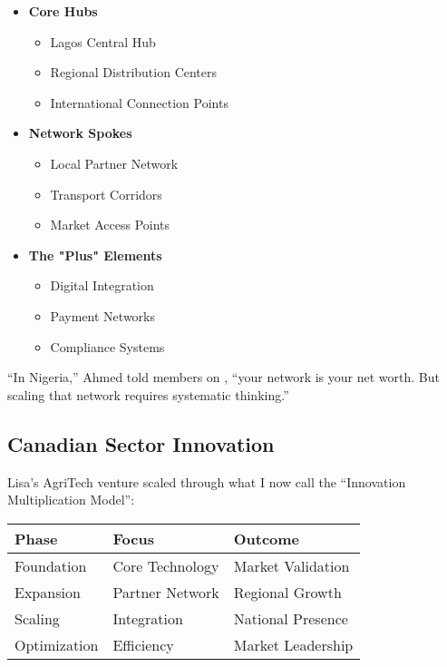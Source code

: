 \begin{tcolorbox}[colback=white,colframe=primarydark,title=\textbf{Trade Network Scaling}]
\begin{itemize}
    \item \textbf{Core Hubs}
    \begin{itemize}
        \item Lagos Central Hub
        \item Regional Distribution Centers
        \item International Connection Points
    \end{itemize}

    \item \textbf{Network Spokes}
    \begin{itemize}
        \item Local Partner Network
        \item Transport Corridors
        \item Market Access Points
    \end{itemize}

    \item \textbf{The "Plus" Elements}
    \begin{itemize}
        \item Digital Integration
        \item Payment Networks
        \item Compliance Systems
    \end{itemize}
\end{itemize}
\end{tcolorbox}

``In Nigeria,'' Ahmed told members on , ``your network is your net worth. But scaling that network requires systematic thinking.''

\subsection{Canadian Sector Innovation}\label{subsec:canadian-sector-innovation}

Lisa's AgriTech venture scaled through what I now call the ``Innovation Multiplication Model'':

\begin{center}
\begin{tabularx}{\textwidth}{>{\raggedright\arraybackslash}X >{\centering\arraybackslash}X >{\raggedright\arraybackslash}X}
    \toprule
    \textbf{Phase} & \textbf{Focus} & \textbf{Outcome} \\
    \midrule
    Foundation & Core Technology & Market Validation \\
    Expansion & Partner Network & Regional Growth \\
    Scaling & Integration & National Presence \\
    Optimization & Efficiency & Market Leadership \\
    \bottomrule
\end{tabularx}
\end{center}

